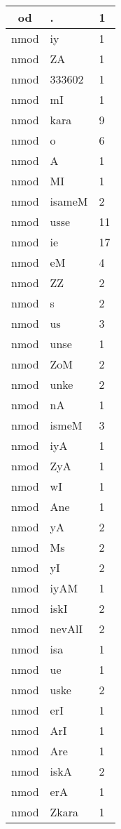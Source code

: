 \documentclass[a4 paper]{article}
\begin{document}
\begin{longtable}{cp{}p{}}
od & . & 1\\ \midrule nmod & iy & 1\\ \midrule nmod & ZA & 1\\ \midrule nmod & 333602 & 1\\ \midrule nmod & mI & 1\\ \midrule nmod & kara & 9\\ \midrule nmod & o & 6\\ \midrule nmod & A & 1\\ \midrule nmod & MI & 1\\ \midrule nmod & isameM & 2\\ \midrule nmod & usse & 11\\ \midrule nmod & ie & 17\\ \midrule nmod & eM & 4\\ \midrule nmod & ZZ & 2\\ \midrule nmod & s & 2\\ \midrule nmod & us & 3\\ \midrule nmod & unse & 1\\ \midrule nmod & ZoM & 2\\ \midrule nmod & unke & 2\\ \midrule nmod & nA & 1\\ \midrule nmod & ismeM & 3\\ \midrule nmod & iyA & 1\\ \midrule nmod & ZyA & 1\\ \midrule nmod & wI & 1\\ \midrule nmod & Ane & 1\\ \midrule nmod & yA & 2\\ \midrule nmod & Ms & 2\\ \midrule nmod & yI & 2\\ \midrule nmod & iyAM & 1\\ \midrule nmod & iskI & 2\\ \midrule nmod & nevAlI & 2\\ \midrule nmod & isa & 1\\ \midrule nmod & ue & 1\\ \midrule nmod & uske & 2\\ \midrule nmod & erI & 1\\ \midrule nmod & ArI & 1\\ \midrule nmod & Are & 1\\ \midrule nmod & iskA & 2\\ \midrule nmod & erA & 1\\ \midrule nmod & Zkara & 1\\ \midrule 

\end{longtable}
\end{document}
